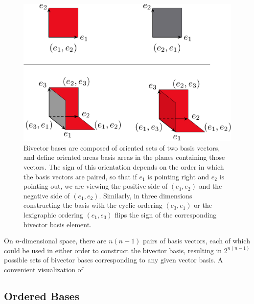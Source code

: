 \documentclass[11pt]{article}
\newcommand{\bv}[1][]{e_{#1}}
\newcommand{\bp}[2]{(#1,#2)}
\begin{document}
\begin{figure}[htbp]
\begin{center}
\includegraphics[width=.75\textwidth]{Low-dimensionalbases}
\caption{Bivector bases are composed of oriented sets of two basis vectors, and define oriented areas basis areas in the planes containing those vectors. The sign of this orientation depends on the order in which the basis vectors are paired, so that if $\bv[1]$ is pointing right and $\bv[2]$ is pointing out, we are viewing the positive side of $\bp{\bv[1]}{\bv[2]}$ and the negative side of $\bp{\bv[1]}{\bv[2]}$. Similarly, in three dimensions constructing the basis with the cyclic ordering $\bp{\bv[3]}{\bv[1]}$ or the lexigraphic ordering $\bp{\bv[1]}{\bv[3]}$ flips the sign of the corresponding bivector basis element.}
\label{fig:lowdimensionalbases}
\end{center}
\end{figure}


On $n$-dimensional space, there are $n(n-1)$ pairs of basis vectors, each of which could be used in either order to construct the bivector basis, resulting in $2^{n(n-1)}$ possible sets of bivector bases corresponding to any given vector basis. A convenient visualization of 


\subsection{Ordered Bases}
\end{document}

